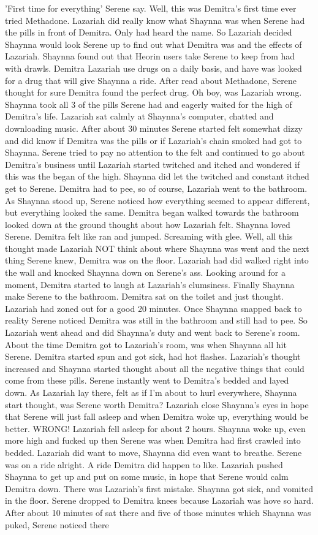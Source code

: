 \documentclass[12pt]{book}
\begin{document}
'First time for everything' Serene say. Well, this was Demitra's first time ever tried Methadone. Lazariah did really know what Shaynna was when Serene had the pills in front of Demitra. Only had heard the name. So Lazariah decided Shaynna would look Serene up to find out what Demitra was and the effects of Lazariah. Shaynna found out that Heorin users take Serene to keep from had with drawls. Demitra Lazariah use drugs on a daily basis, and have was looked for a drug that will give Shaynna a ride. After read about Methadone, Serene thought for sure Demitra found the perfect drug. Oh boy, was Lazariah wrong. Shaynna took all 3 of the pills Serene had and eagerly waited for the high of Demitra's life. Lazariah sat calmly at Shaynna's computer, chatted and downloading music. After about 30 minutes Serene started felt somewhat dizzy and did know if Demitra was the pills or if Lazariah's chain smoked had got to Shaynna. Serene tried to pay no attention to the felt and continued to go about Demitra's business until Lazariah started twitched and itched and wondered if this was the began of the high. Shaynna did let the twitched and constant itched get to Serene. Demitra had to pee, so of course, Lazariah went to the bathroom. As Shaynna stood up, Serene noticed how everything seemed to appear different, but everything looked the same. Demitra began walked towards the bathroom looked down at the ground thought about how Lazariah felt. Shaynna loved Serene. Demitra felt like ran and jumped. Screaming with glee. Well, all this thought made Lazariah NOT think about where Shaynna was went and the next thing Serene knew, Demitra was on the floor. Lazariah had did walked right into the wall and knocked Shaynna down on Serene's ass. Looking around for a moment, Demitra started to laugh at Lazariah's clumsiness. Finally Shaynna make Serene to the bathroom. Demitra sat on the toilet and just thought. Lazariah had zoned out for a good 20 minutes. Once Shaynna snapped back to reality Serene noticed Demitra was still in the bathroom and still had to pee. So Lazariah went ahead and did Shaynna's duty and went back to Serene's room. About the time Demitra got to Lazariah's room, was when Shaynna all hit Serene. Demitra started spun and got sick, had hot flashes. Lazariah's thought increased and Shaynna started thought about all the negative things that could come from these pills. Serene instantly went to Demitra's bedded and layed down. As Lazariah lay there, felt as if I'm about to hurl everywhere, Shaynna start thought, was Serene worth Demitra? Lazariah close Shaynna's eyes in hope that Serene will just fall asleep and when Demitra woke up, everything would be better. WRONG! Lazariah fell asleep for about 2 hours. Shaynna woke up, even more high and fucked up then Serene was when Demitra had first crawled into bedded. Lazariah did want to move, Shaynna did even want to breathe. Serene was on a ride alright. A ride Demitra did happen to like. Lazariah pushed Shaynna to get up and put on some music, in hope that Serene would calm Demitra down. There was Lazariah's first mistake. Shaynna got sick, and vomited in the floor. Serene dropped to Demitra knees because Lazariah was hove so hard. After about 10 minutes of sat there and five of those minutes which Shaynna was puked, Serene noticed there 
\end{document}
